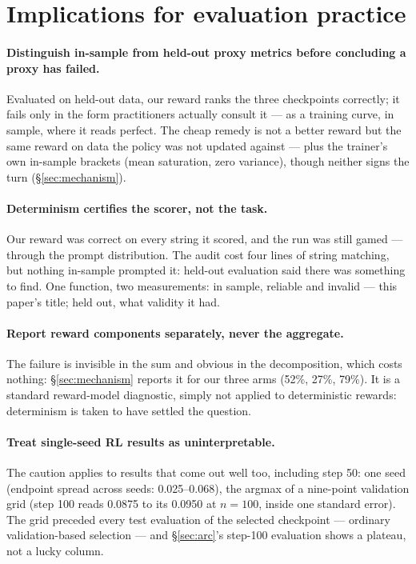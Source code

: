 \documentclass{article}
\begin{document}
\section{Implications for evaluation practice}
\label{sec:implications}

\paragraph{Distinguish in-sample from held-out proxy metrics before
concluding a proxy has failed.} Evaluated on held-out data, our reward
ranks the three checkpoints correctly; it fails only in the form
practitioners actually consult it --- as a training curve, in sample, where
it reads perfect. The cheap remedy is not a better reward but the same
reward on data the policy was not updated against --- plus the trainer's
own in-sample brackets (mean saturation, zero variance), though neither
signs the turn (\S\ref{sec:mechanism}).

\paragraph{Determinism certifies the scorer, not the task.} Our reward was
correct on every string it scored, and the run was still gamed --- through
the prompt distribution. The audit cost four lines of string matching, but nothing in-sample
prompted it: held-out evaluation said there was something to find.
One function, two measurements: in sample, reliable and invalid --- this
paper's title; held out, what validity it had.

\paragraph{Report reward components separately, never the aggregate.} The
failure is invisible in the sum and obvious in the decomposition, which
costs nothing: \S\ref{sec:mechanism} reports it for our three arms (52\%,
27\%, 79\%). It is a standard reward-model diagnostic, simply not applied to
deterministic rewards: determinism is taken to have settled the question.

\paragraph{Treat single-seed RL results as uninterpretable.} The caution
applies to results that come out well too, including step 50: one seed
(endpoint spread across seeds: 0.025--0.068), the argmax of a
nine-point validation grid (step 100 reads 0.0875 to its 0.0950 at
$n=100$, inside one standard error). The grid preceded every test
evaluation of the selected checkpoint --- ordinary validation-based
selection --- and \S\ref{sec:arc}'s step-100 evaluation shows a plateau,
not a lucky column.
\end{document}
